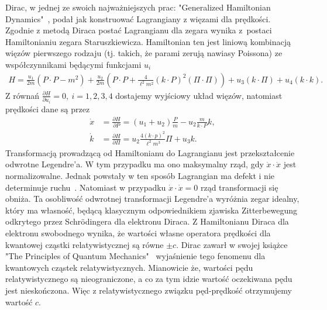 Dirac, w jednej ze swoich najważniejszych prac: 
"Generalized Hamiltonian Dynamics"~\cite{DiracHam}, podał
jak konstruować Lagrangiany z więzami dla prędkości.
Zgodnie z metodą Diraca postać Lagrangianu dla zegara wynika 
z~postaci Hamiltonianiu zegara Staruszkiewicza. Hamiltonian
ten jest liniową kombinacją więzów pierwszego rodzaju (tj. 
takich, że parami zerują nawiasy Poissona) ze współczynnikami będącymi 
funkcjami $u_i$
\begin{align*}
H = \frac{u_1}{2m} \left(P\cdot P -m^2 \right) 
+ \frac{u_2}{2m } \left( P\cdot P + \frac{4}{\ell^2 m^2} (k\cdot P)^2 
(\Pi \cdot \Pi) \right)
+ u_3 (k \cdot \Pi ) + u_4 (k \cdot k).
\end{align*}
Z równań $\frac{\partial H}{\partial u_i} = 0 ,\ i=1,2,3,4$ 
dostajemy wyjściowy
układ więzów, natomiast prędkości dane są przez
\begin{align*}
\dot{x} &= \frac{\partial H}{\partial P} = 
(u_1 + u_2 )\frac{P}{m} - u_2 \frac{m}{k\cdot P} k,\\
\dot{k} &= \frac{\partial H}{\partial \Pi} =  
u_2\frac{4 (k\cdot p)^2}{\ell^2m^3}\Pi +u_3 k .
\end{align*}
Transformacją
prowadzącą od Hamiltonianu do Lagrangianu jest 
przekształcenie odwrotne Legendre'a. 
W tym przypadku ma ono maksymalny rząd, gdy $\dot{x} \cdot \dot{x}$ 
jest normalizowalne. Jednak powstały w ten sposób Lagrangian
ma defekt i nie determinuje ruchu~\cite{Bratek2015wiele}.
Natomiast w przypadku $\dot{x} \cdot \dot{x} = 0$  rząd transformacji
 się obniża. 
Ta osobliwość odwrotnej transformacji Legendre'a 
wyróżnia zegar idealny, który ma własność, będącą klasycznym 
odpowiednikiem zjawiska Zitterbewegung
odkrytego przez Schrödingera dla elektronu Diraca. 
Z Hamiltonianu Diraca dla elektronu swobodnego wynika, że 
wartości własne operatora prędkości dla kwantowej cząstki
relatywistycznej są równe $\pm c$. 
Dirac zawarł w swojej książce "The Principles of
Quantum Mechanics"~\cite{principia} 
wyjaśnienie tego fenomenu dla kwantowych
cząstek relatywistycznych. Mianowicie że, wartości pędu relatywistycznego
są nieograniczone, a co za tym idzie 
wartość oczekiwana pędu jest nieskończona. Więc 
z relatywistycznego związku pęd-prędkość otrzymujemy wartość $c$.

